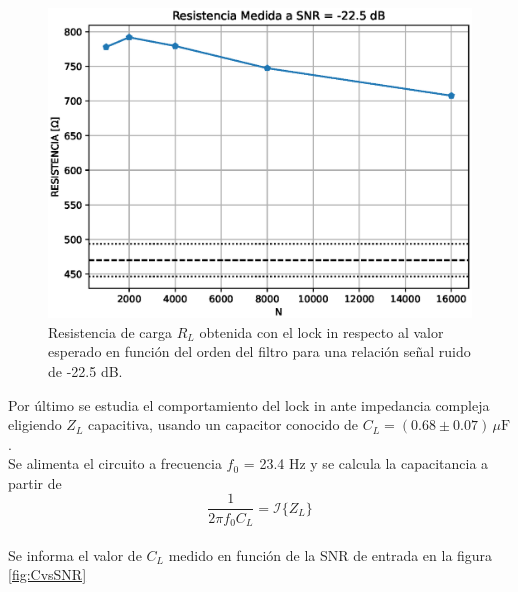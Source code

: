 \documentclass[11pt,a4paper]{extarticle}
\begin{document}
\begin{multicols}{2}
\begin{figure}[H]
	\centering
	\includegraphics[width=\linewidth]{Images/R_orden.eps}
	\caption{Resistencia de carga $R_L$ obtenida con 
	el lock in respecto al valor esperado en función
	del orden del filtro para  
	una relación señal ruido de -22.5 dB.}
	\label{fig:RORDEN}
\end{figure}

Por último se estudia el comportamiento del lock in ante impedancia compleja eligiendo $Z_L$ capacitiva, usando un capacitor conocido de $C_L = (0.68 \pm 0.07) \, \mu \mathrm F$.\\

Se alimenta el circuito a frecuencia $f_0$ = 23.4 Hz y se calcula la capacitancia a partir de
\begin{equation*}
	\frac{1}{2\pi f_0 C_L} = \mathcal I \{Z_L\}
\end{equation*}\\[-1em]

Se informa el valor de $C_L$ medido en función de la SNR de entrada en la figura \ref{fig:CvsSNR}\\ 


\end{multicols}
\end{document}
